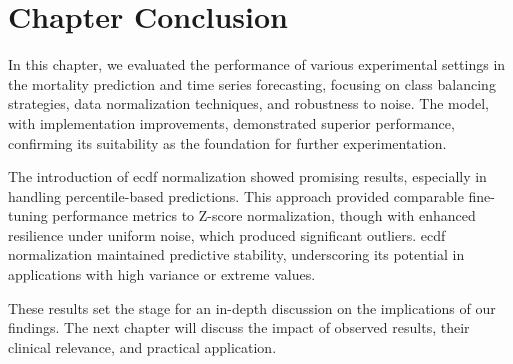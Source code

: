 \section{Chapter Conclusion}

In this chapter, we evaluated the performance of various experimental settings in the mortality prediction and time series forecasting, focusing on class balancing strategies, data normalization techniques, and robustness to noise. The  model, with implementation improvements, demonstrated superior performance, confirming its suitability as the foundation for further experimentation.

The introduction of \gls{ecdf} normalization showed promising results, especially in handling percentile-based predictions. This approach provided comparable fine-tuning performance metrics to Z-score normalization, though with enhanced resilience under uniform noise, which produced significant outliers. \gls{ecdf} normalization maintained predictive stability, underscoring its potential in applications with high variance or extreme values.

These results set the stage for an in-depth discussion on the implications of our findings. The next chapter will discuss the impact of observed results, their clinical relevance, and practical application.

